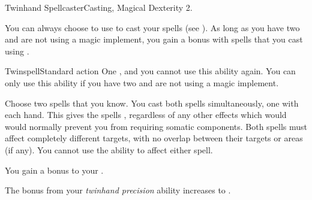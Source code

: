   \begin{magicalfeat}{Twinhand Spellcaster}{Casting, Magical}
    \featpre Dexterity 2.

     You can always choose to use  to cast your spells (see ).
    As long as you have two  and are not using a magic implement, you gain a   bonus with spells that you cast using .

    \begin{magicalactiveability}{Twinspell}{Standard action}
      \abilitycost One , and you  cannot use this ability again.
      \rankline
      You can only use this ability if you have two  and are not using a magic implement.

      Choose two spells that you know.
      You cast both spells simultaneously, one with each hand.
      This gives the spells , regardless of any other effects which would would normally prevent you from requiring somatic components.
      Both spells must affect completely different targets, with no overlap between their targets or areas (if any).
      You cannot use the  ability to affect either spell.
    \end{magicalactiveability}

     You gain a  bonus to your .

     The bonus from your \textit{twinhand precision} ability increases to .
  \end{magicalfeat}

